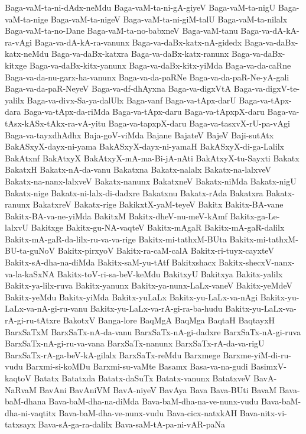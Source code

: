 {Baga-vaM-ta-ni-dAdx-neMdu
Baga-vaM-ta-ni-gA-giyeV
Baga-vaM-ta-nigU
Baga-vaM-ta-nige
Baga-vaM-ta-nigeV
Baga-vaM-ta-ni-giM-talU
Baga-vaM-ta-nilalx
Baga-vaM-ta-no-Dane
Baga-vaM-ta-no-babxneV
Baga-vaM-tanu
Baga-va-dA-kA-ra-vAgi
Baga-va-dA-kA-ra-vanunx
Baga-va-daBx-katx-nA-gidedx
Baga-va-daBx-katx-neMdu
Baga-va-daBx-katxra
Baga-va-daBx-katx-ranunx
Baga-va-daBx-kitxge
Baga-va-daBx-kitx-yanunx
Baga-va-daBx-kitx-yiMda
Baga-va-da-caRne
Baga-va-da-nu-garx-ha-vanunx
Baga-va-da-paRNe
Baga-va-da-paR-Ne-yA-gali
Baga-va-da-paR-NeyeV
Baga-va-df-dhAyxna
Baga-va-digxVtA
Baga-va-digxV-te-yalilx
Baga-va-divx-Sa-ya-dalUlx
Baga-vanf
Baga-va-tApx-darU
Baga-va-tApx-dara
Baga-va-tApx-da-riMda
Baga-va-tApx-daru
Baga-va-tApxpX-daru
Baga-va-tAsx-kASx-tAkx-ra-vA-yitu
Baga-va-tapxpX-daru
Baga-va-tasxvX-rU-pa-vAgi
Baga-va-tayxdhAdhx
Baja-goV-viMda
Bajane
BajateV
BajeV
Baji-sutAtx
BakASxyX-dayx-ni-yama
BakASxyX-dayx-ni-yamaH
BakASxyX-di-ga-Lalilx
BakAtxnf
BakAtxyX
BakAtxyX-mA-ma-Bi-jA-nAti
BakAtxyX-tu-Sayxti
Bakatx
BakatxH
Bakatx-nA-da-vanu
Bakatxna
Bakatx-nalalx
Bakatx-na-lalxveV
Bakatx-na-nanx-lalxveV
Bakatx-nanunx
BakatxneV
Bakatx-niMda
Bakatx-nigU
Bakatx-nige
Bakatx-ni-lalx-di-dadxre
Bakatxnu
Bakatx-rAda
Bakatxra
Bakatx-ranunx
BakatxreV
Bakatx-rige
BakikxtX-yaM-teyeV
Bakitx
Bakitx-BA-vane
Bakitx-BA-va-ne-yiMda
BakitxM
Bakitx-dheV-nu-meV-kAmf
Bakitx-ga-Le-lalxvU
Bakitxge
Bakitx-gu-NA-vaqteV
Bakitx-mAgaR
Bakitx-mA-gaR-dalilx
Bakitx-mA-gaR-da-lilx-ru-va-va-rige
Bakitx-mi-tathxM-BUta
Bakitx-mi-tathxM-BU-ta-guNoV
Bakitx-pirxyoV
Bakitx-ra-caM-calA
Bakitx-ri-tuyx-cayxteV
Bakitx-sA-dha-na-diMda
Bakitx-saM-yu-tAtf
Bakitxshacx
Bakitx-shecxV-nanx-va-la-kaSxNA
Bakitx-toV-ri-sa-beV-keMdu
BakitxyU
Bakitxya
Bakitx-yalilx
Bakitx-ya-lilx-ruva
Bakitx-yanunx
Bakitx-ya-nunx-LaLx-vaneV
Bakitx-yeMdeV
Bakitx-yeMdu
Bakitx-yiMda
Bakitx-yuLaLx
Bakitx-yu-LaLx-va-nAgi
Bakitx-yu-LaLx-va-nA-gi-ru-vanu
Bakitx-yu-LaLx-va-rA-gi-ra-ba-hudu
Bakitx-yu-LaLx-va-rA-gi-ru-tAtxre
BakotxV
Banga-lore
BaqMgA
BaqMga
BaqtaH
BaqtayxH
BarxSaTxM
BarxSaTx-nA-da-vanu
BarxSaTx-nA-gi-dadxre
BarxSaTx-nA-gi-ruva
BarxSaTx-nA-gi-ru-va-vana
BarxSaTx-nanunx
BarxSaTx-rA-da-va-rigU
BarxSaTx-rA-ga-beV-kA-gilalx
BarxSaTx-reMdu
Barxmege
Barxme-yiM-di-ru-vudu
Barxmi-si-koMDu
Barxmi-su-vaMte
Basamx
Basa-va-na-gudi
BasimxV-kaqtoV
Batatx
Batatxda
Batatx-daSuTx
Batatx-vanunx
BatatxveV
BavA-NaRvaM
BavAni
BavAniVM
BavA-niyeV
BavAya
Bava
Bava-BUti
BavaM
Bava-baM-dhana
Bava-baM-dha-na-diMda
Bava-baM-dha-na-ve-nunx-vudu
Bava-baM-dha-ni-vaqtitx
Bava-baM-dha-ve-nunx-vudu
Bava-cicx-natxkAH
Bava-nitx-vi-tatxsayx
Bava-sA-ga-ra-dalilx
Bava-saM-tA-pa-ni-vAR-paNa
}
